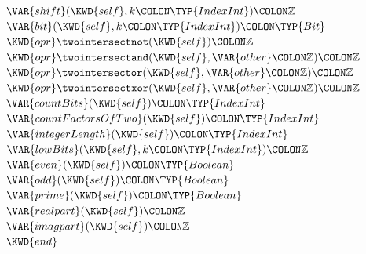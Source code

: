 \begin{Fortress}
\(  \VAR{shift}(\KWD{self}, k\COLON \TYP{IndexInt})\COLON \mathbb{Z}\)\\
\(  \VAR{bit}(\KWD{self}, k\COLON \TYP{IndexInt})\COLON \TYP{Bit}\)\\
\(  \KWD{opr} \mathord{\twointersectnot}(\KWD{self})\COLON \mathbb{Z}\)\\
\(  \KWD{opr} \mathord{\twointersectand}(\KWD{self}, \VAR{other}\COLON \mathbb{Z})\COLON \mathbb{Z}\)\\
\(  \KWD{opr} \mathord{\twointersector}(\KWD{self}, \VAR{other}\COLON \mathbb{Z})\COLON \mathbb{Z}\)\\
\(  \KWD{opr} \mathord{\twointersectxor}(\KWD{self}, \VAR{other}\COLON \mathbb{Z})\COLON \mathbb{Z}\)\\
\(  \VAR{countBits}(\KWD{self})\COLON \TYP{IndexInt}\)\\
\(  \VAR{countFactorsOfTwo}(\KWD{self})\COLON \TYP{IndexInt}\)\\
\(  \VAR{integerLength}(\KWD{self})\COLON \TYP{IndexInt}\)\\
\(  \VAR{lowBits}(\KWD{self}, k\COLON \TYP{IndexInt})\COLON \mathbb{Z}\)\\
\(  \VAR{even}(\KWD{self})\COLON \TYP{Boolean}\)\\
\(  \VAR{odd}(\KWD{self})\COLON \TYP{Boolean}\)\\
\(  \VAR{prime}(\KWD{self})\COLON \TYP{Boolean}\)\\
\(  \VAR{realpart}(\KWD{self})\COLON \mathbb{Z}\)\\
\(  \VAR{imagpart}(\KWD{self})\COLON \mathbb{Z}\)\-\\\poptabs
\(\KWD{end}\)
\end{Fortress}
